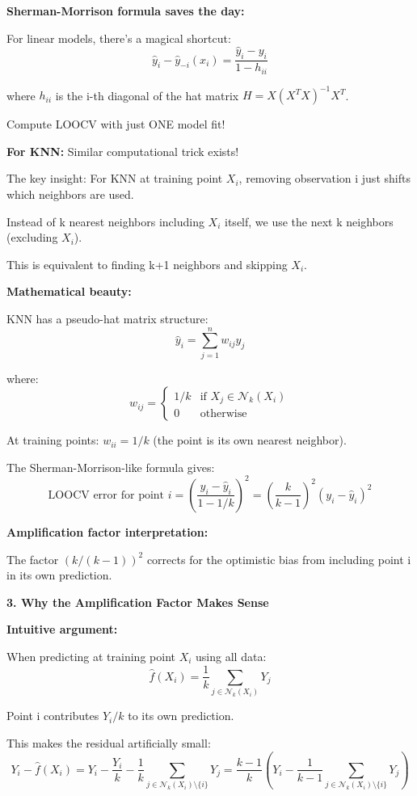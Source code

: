 \documentclass[12pt]{article}
\begin{document}
\begin{explanation}
\textbf{Sherman-Morrison formula saves the day:}

For linear models, there's a magical shortcut:
\[
\hat{y}_i - \hat{y}_{-i}(x_i) = \frac{\hat{y}_i - y_i}{1 - h_{ii}}
\]

where $h_{ii}$ is the i-th diagonal of the hat matrix $H = X(X^T X)^{-1}X^T$.

Compute LOOCV with just ONE model fit!

\textbf{For KNN:} Similar computational trick exists!

The key insight: For KNN at training point $X_i$, removing observation i just shifts which neighbors are used.

Instead of k nearest neighbors including $X_i$ itself, we use the next k neighbors (excluding $X_i$).

This is equivalent to finding k+1 neighbors and skipping $X_i$.

\textbf{Mathematical beauty:}

KNN has a pseudo-hat matrix structure:
\[
\hat{y}_i = \sum_{j=1}^n w_{ij} y_j
\]

where:
\[
w_{ij} = \begin{cases}
1/k & \text{if } X_j \in \mathcal{N}_k(X_i) \\
0 & \text{otherwise}
\end{cases}
\]

At training points: $w_{ii} = 1/k$ (the point is its own nearest neighbor).

The Sherman-Morrison-like formula gives:
\[
\text{LOOCV error for point } i = \left(\frac{y_i - \hat{y}_i}{1 - 1/k}\right)^2 = \left(\frac{k}{k-1}\right)^2(y_i - \hat{y}_i)^2
\]

\textbf{Amplification factor interpretation:}

The factor $(k/(k-1))^2$ corrects for the optimistic bias from including point i in its own prediction.

\textbf{3. Why the Amplification Factor Makes Sense}

\textbf{Intuitive argument:}

When predicting at training point $X_i$ using all data:
\[
\hat{f}(X_i) = \frac{1}{k}\sum_{j \in \mathcal{N}_k(X_i)} Y_j
\]

Point i contributes $Y_i/k$ to its own prediction.

This makes the residual artificially small:
\[
Y_i - \hat{f}(X_i) = Y_i - \frac{Y_i}{k} - \frac{1}{k}\sum_{j \in \mathcal{N}_k(X_i) \setminus \{i\}} Y_j = \frac{k-1}{k}\left(Y_i - \frac{1}{k-1}\sum_{j \in \mathcal{N}_k(X_i) \setminus \{i\}} Y_j\right)
\]


\end{explanation}
\end{document}
